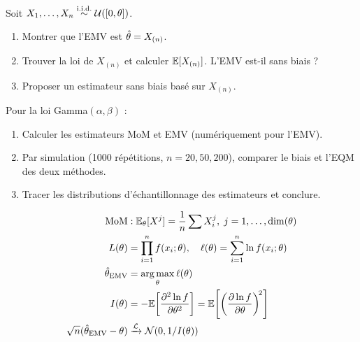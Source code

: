 \begin{exercice}
Soit $X_1,\ldots,X_n\overset{\text{i.i.d.}}{\sim}\mathcal{U}([0,\theta])$.
\begin{enumerate}
\item Montrer que l'EMV est $\hat{\theta}=X_{(n)}$.
\item Trouver la loi de $X_{(n)}$ et calculer $\mathbb{E}[X_{(n)}]$. L'EMV est-il sans biais ?
\item Proposer un estimateur sans biais bas\'e sur $X_{(n)}$.
\end{enumerate}
\end{exercice}

\begin{exercice}
Pour la loi Gamma$(\alpha,\beta)$ :
\begin{enumerate}
\item Calculer les estimateurs MoM et EMV (num\'eriquement pour l'EMV).
\item Par simulation (1000 r\'ep\'etitions, $n=20,50,200$), comparer le biais et l'EQM des deux m\'ethodes.
\item Tracer les distributions d'\'echantillonnage des estimateurs et conclure.
\end{enumerate}
\end{exercice}

\begin{formules}
\begin{align*}
\text{MoM} &: \mathbb{E}_\theta[X^j] = \frac{1}{n}\sum X_i^j,\; j=1,\ldots,\dim(\theta) \\
L(\theta) &= \prod_{i=1}^n f(x_i;\theta), \quad \ell(\theta)=\sum_{i=1}^n \ln f(x_i;\theta) \\
\hat{\theta}_{\mathrm{EMV}} &= \operatorname*{arg\,max}_\theta \ell(\theta) \\
I(\theta) &= -\mathbb{E}\!\left[\frac{\partial^2\ln f}{\partial\theta^2}\right] = \mathbb{E}\!\left[\left(\frac{\partial\ln f}{\partial\theta}\right)^{\!2}\right] \\
\sqrt{n}(\hat{\theta}_{\mathrm{EMV}}-\theta) &\xrightarrow{\mathcal{L}} \mathcal{N}(0,1/I(\theta))
\end{align*}
\end{formules}
